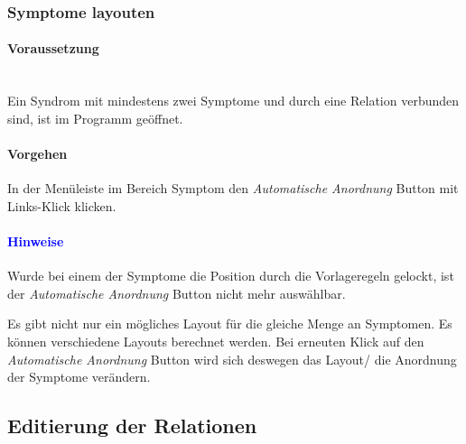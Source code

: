 \documentclass[enabledeprecatedfontcommands,fontsize=11pt,paper=a4,twoside]{scrartcl}
\newcounter{one}
\newcounter{two}[one]
\newcommand*{\hint}{\paragraph{\textcolor{blue}{Hinweise}}}
\newcommand*{\condition}{\paragraph{Voraussetzung}$\;$ \vspace{0.2cm}\\}
\newcommand*{\action}{\paragraph{Vorgehen}}
\let\tempone\itemize
\let\temptwo\enditemize
\renewenvironment{itemize}{\tempone\addtolength{\itemsep}{-10.0pt}}{\temptwo}
\let\origenumerate\enumerate
\let\origendenumerate\endenumerate
\renewenvironment{enumerate}{\origenumerate \addtolength{\itemsep}{-10.0pt}}{\origendenumerate}
\begin{document}
		\subsubsection{Symptome layouten}
		\condition 	
		Ein Syndrom mit mindestens zwei Symptome und durch eine Relation verbunden sind, ist im Programm geöffnet. 
		\action 
		\begin{enumerate}
			\item In der Menüleiste im Bereich Symptom den \textit{Automatische Anordnung} Button mit Links-Klick klicken.
		\end{enumerate}
		\hint
		\begin{itemize}
			\item Wurde bei einem der Symptome die Position durch die Vorlageregeln gelockt, ist der \textit{Automatische Anordnung} Button nicht mehr auswählbar.
			\item Es gibt nicht nur ein mögliches Layout für die gleiche Menge an Symptomen. Es können verschiedene Layouts berechnet werden. Bei erneuten Klick auf den \textit{Automatische Anordnung} Button wird sich deswegen das Layout/ die Anordnung der Symptome verändern. \\
		\end{itemize}	
			
\subsection{Editierung der Relationen} \label{relations}
\end{document}
